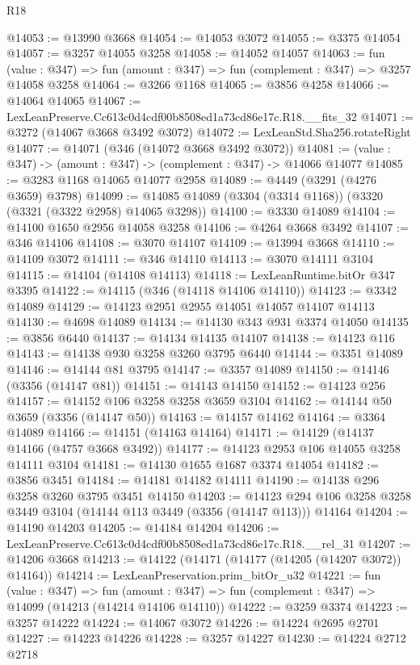 \begin{lexlean}{R18}
\begin{coremodule}
@14053 := @13990 @3668
@14054 := @14053 @3072
@14055 := @3375 @14054
@14057 := @3257 @14055 @3258
@14058 := @14052 @14057
@14063 := fun (value : @347) => fun (amount : @347) => fun (complement : @347) => @3257 @14058 @3258
@14064 := @3266 @1168
@14065 := @3856 @4258
@14066 := @14064 @14065
@14067 := LexLeanPreserve.Cc613c0d4cdf00b8508ed1a73cd86e17c.R18.__fits_32
@14071 := @3272 (@14067 @3668 @3492 @3072)
@14072 := LexLeanStd.Sha256.rotateRight
@14077 := @14071 (@346 (@14072 @3668 @3492 @3072))
@14081 := (value : @347) -> (amount : @347) -> (complement : @347) -> @14066 @14077
@14085 := @3283 @1168 @14065 @14077 @2958
@14089 := @4449 (@3291 (@4276 @3659) @3798)
@14099 := @14085 @14089 (@3304 (@3314 @1168)) (@3320 (@3321 (@3322 @2958) @14065 @3298))
@14100 := @3330 @14089
@14104 := @14100 @1650 @2956 @14058 @3258
@14106 := @4264 @3668 @3492
@14107 := @346 @14106
@14108 := @3070 @14107
@14109 := @13994 @3668
@14110 := @14109 @3072
@14111 := @346 @14110
@14113 := @3070 @14111 @3104
@14115 := @14104 (@14108 @14113)
@14118 := LexLeanRuntime.bitOr @347 @3395
@14122 := @14115 (@346 (@14118 @14106 @14110))
@14123 := @3342 @14089
@14129 := @14123 @2951 @2955 @14051 @14057 @14107 @14113
@14130 := @4698 @14089
@14134 := @14130 @343 @931 @3374 @14050
@14135 := @3856 @6440
@14137 := @14134 @14135 @14107
@14138 := @14123 @116
@14143 := @14138 @930 @3258 @3260 @3795 @6440
@14144 := @3351 @14089
@14146 := @14144 @81 @3795
@14147 := @3357 @14089
@14150 := @14146 (@3356 (@14147 @81))
@14151 := @14143 @14150
@14152 := @14123 @256
@14157 := @14152 @106 @3258 @3258 @3659 @3104
@14162 := @14144 @50 @3659 (@3356 (@14147 @50))
@14163 := @14157 @14162
@14164 := @3364 @14089
@14166 := @14151 (@14163 @14164)
@14171 := @14129 (@14137 @14166 (@4757 @3668 @3492))
@14177 := @14123 @2953 @106 @14055 @3258 @14111 @3104
@14181 := @14130 @1655 @1687 @3374 @14054
@14182 := @3856 @3451
@14184 := @14181 @14182 @14111
@14190 := @14138 @296 @3258 @3260 @3795 @3451 @14150
@14203 := @14123 @294 @106 @3258 @3258 @3449 @3104 (@14144 @113 @3449 (@3356 (@14147 @113))) @14164
@14204 := @14190 @14203
@14205 := @14184 @14204
@14206 := LexLeanPreserve.Cc613c0d4cdf00b8508ed1a73cd86e17c.R18.__rel_31
@14207 := @14206 @3668
@14213 := @14122 (@14171 (@14177 (@14205 (@14207 @3072)) @14164))
@14214 := LexLeanPreservation.prim_bitOr_u32
@14221 := fun (value : @347) =>
  fun (amount : @347) => fun (complement : @347) => @14099 (@14213 (@14214 @14106 @14110))
@14222 := @3259 @3374
@14223 := @3257 @14222
@14224 := @14067 @3072
@14226 := @14224 @2695 @2701
@14227 := @14223 @14226
@14228 := @3257 @14227
@14230 := @14224 @2712 @2718

\end{coremodule}
\end{lexlean}
